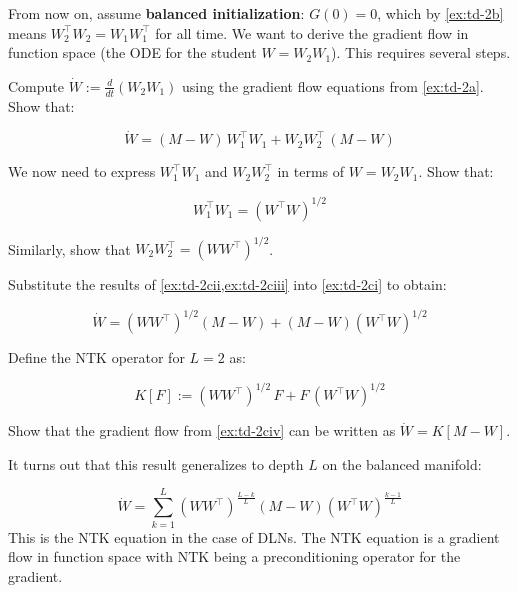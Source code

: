 \documentclass[11pt]{article}
\begin{document}
From now on, assume \textbf{balanced initialization}:
\(G(0) = 0\), which by \cref{ex:td-2b} means \(W_2^\top W_2 = W_1 W_1^\top\)
for all time. We want to derive the gradient flow in function space (the
ODE for the student \(W = W_2 W_1\)). This requires several steps.

\begin{exercise}
\label{ex:td-2ci}
Compute \(\dot{W} := \frac{d}{dt}(W_2 W_1)\) using the
gradient flow equations from \cref{ex:td-2a}. Show that:

\[\dot{W} = (M - W)\, W_1^\top W_1 + W_2 W_2^\top\, (M - W)\]
\end{exercise}


\begin{exercise}
\label{ex:td-2cii}
We now need to express \(W_1^\top W_1\) and
\(W_2 W_2^\top\) in terms of \(W = W_2 W_1\). Show that:

\[W_1^\top W_1 = (W^\top W)^{1/2}\]
\end{exercise}


\begin{exercise}
\label{ex:td-2ciii}
Similarly, show that
\(W_2 W_2^\top = (W W^\top)^{1/2}\).
\end{exercise}


\begin{exercise}
\label{ex:td-2civ}
Substitute the results of \cref{ex:td-2cii,ex:td-2ciii} into \cref{ex:td-2ci}
to obtain:

\[\dot{W} = (W W^\top)^{1/2}(M - W) + (M - W)(W^\top W)^{1/2}\]
\end{exercise}


\begin{exercise}
\label{ex:td-2d}
Define the NTK operator for \(L = 2\) as:

\[K[F] := (WW^\top)^{1/2}\, F + F\, (W^\top W)^{1/2}\]

Show that the gradient flow from \cref{ex:td-2civ} can be written as
\(\dot{W} = K[M - W]\).

It turns out that this result generalizes to depth \(L\) on the balanced
manifold:

\[\dot{W} = \sum_{k=1}^{L} (WW^\top)^{\frac{L-k}{L}} (M - W) (W^\top W)^{\frac{k-1}{L}}\]
This is the NTK equation in the case of DLNs. The NTK equation is a gradient flow in function space with NTK being a preconditioning operator for the gradient.
\end{exercise}
\end{document}

